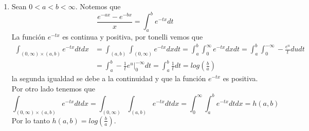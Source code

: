 \documentclass{article}
\begin{document}
\begin{enumerate}
    \item Sean $0<a<b<\infty$. Notemos que
    \begin{equation*}
        \frac{e^{-ax}-e^{-bx}}{x}=\int_{a}^{b}e^{-tx}dt
    \end{equation*}
    La función $e^{-tx}$ es continua y positiva, por tonelli vemos que
    \begin{align*}
        \int_{(0,\infty)\times(a,b)}e^{-tx}dtdx &= \int_{(a,b)}\int_{(0,\infty)}e^{-tx}dxdt
        =\int_{a}^{b}\int_{0}^{\infty}e^{-tx}dxdt=\int_{a}^{b}\int_{0}^{-\infty}-\frac{e^{u}}{t}
        dudt \\[2mm]
        &= \int_{a}^{b}-\frac{1}{t}e^{u}\Big|_{0}^{-\infty}dt=\int_{a}^{b}\frac{1}{t}dt
        =log\left(\frac{b}{a}\right)
    \end{align*}
    la segunda igualdad se debe a la continuidad y que la función $e^{-tx}$ es positiva. 
    Por otro lado tenemos que
    \begin{equation*}
        \int_{(0,\infty)\times(a,b)}e^{-tx}dtdx=\int_{(0,\infty)}\int_{(a,b)}e^{-tx}dtdx
        =\int_{0}^{\infty}\int_{a}^{b}e^{-tx}dtdx=h(a,b)
    \end{equation*}
    Por lo tanto $h(a,b)=log\left(\frac{b}{a}\right)$.
\end{enumerate}
\end{document}
